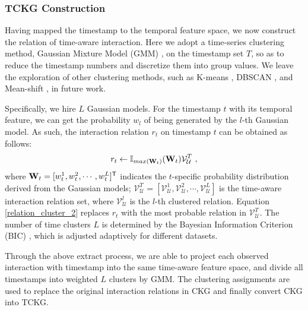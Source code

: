 
\subsubsection{\textbf{TCKG Construction}}
Having mapped the timestamp to the temporal feature space, we now construct the relation of time-aware interaction.
Here we adopt a time-series clustering method, Gaussian Mixture Model (GMM) \cite{gmm}, on the timestamp set $T$, so as to reduce the timestamp numbers and discretize them into group values.
We leave the exploration of other clustering methods, such as K-means \cite{kmeans}, DBSCAN \cite{ester1996density}, and Mean-shift \cite{meanshift}, in future work.

Specifically, we hire $L$ Gaussian models. For the timestamp $t$ with its temporal feature, we can get the probability $w_{l}$ of being generated by the $l$-th Gaussian model.
As such, the interaction relation $r_t$ on timestamp $t$ can be obtained as follows:
\begin{equation}\label{relation_cluster_2}
	r_t \leftarrow \mathbb{I}_{max(\textbf{W}_{t})}(\textbf{W}_{t}) {\mathcal{V}_{\mathcal{U}}^T} \ ,
\end{equation}
where $\textbf{W}_{t} = [w^{1}_t, w^{2}_t, \cdots, w^{L}_t]^{\mathsf{T}}$ indicates the $t$-specific probability distribution derived from the Gaussian models;
${\mathcal{V}}_{\mathcal{U}}^T = [\mathcal{V}_{\mathcal{U}}^1, \mathcal{V}_{\mathcal{U}}^2, \cdots, \mathcal{V}_{\mathcal{U}}^{L}]$ is the time-aware interaction relation set, where $\mathcal{V}_{\mathcal{U}}^{l}$ is the $l$-th clustered relation.
Equation \eqref{relation_cluster_2} replaces $r_t$ with the most probable relation in ${\mathcal{V}}_{\mathcal{U}}^T$.
The number of time clusters $L$ is determined by the Bayesian Information Criterion (BIC) \cite{bic}, which is adjusted adaptively for different datasets.


Through the above extract process, we are able to project each observed interaction with timestamp into the same time-aware feature space, and divide all timestamps into weighted $L$ clusters by GMM.
The clustering assignments are used to replace the original interaction relations in CKG and finally convert CKG into TCKG.


